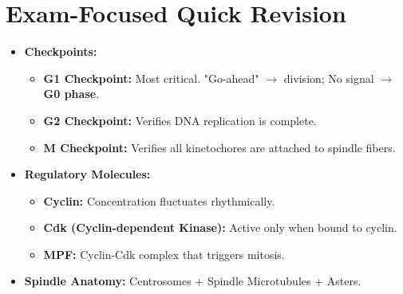 \documentclass[11pt, a4paper]{article}
\begin{document}
\section*{Exam-Focused Quick Revision}
\begin{itemize}
    \item \textbf{Checkpoints:}
    \begin{itemize}
        \item \textbf{G1 Checkpoint:} Most critical. "Go-ahead" $\rightarrow$ division; No signal $\rightarrow$ \textbf{G0 phase}.
        \item \textbf{G2 Checkpoint:} Verifies DNA replication is complete.
        \item \textbf{M Checkpoint:} Verifies all kinetochores are attached to spindle fibers.
    \end{itemize}
    \item \textbf{Regulatory Molecules:}
    \begin{itemize}
        \item \textbf{Cyclin:} Concentration fluctuates rhythmically.
        \item \textbf{Cdk (Cyclin-dependent Kinase):} Active only when bound to cyclin.
        \item \textbf{MPF:} Cyclin-Cdk complex that triggers mitosis.
    \end{itemize}
    \item \textbf{Spindle Anatomy:} Centrosomes + Spindle Microtubules + Asters.
\end{itemize}
\end{document}
